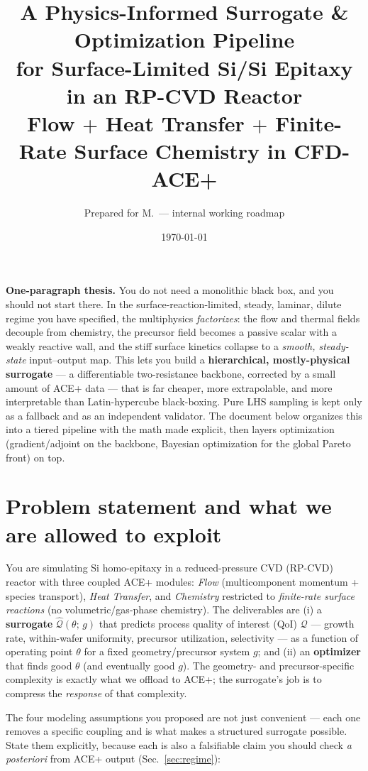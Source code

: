 \documentclass[11pt]{article}
\title{\vspace{-1.2cm}\textbf{A Physics-Informed Surrogate \& Optimization Pipeline\\ for Surface-Limited Si/Si Epitaxy in an RP-CVD Reactor}\\[2pt]
\large\normalfont\color{accent} Flow $+$ Heat Transfer $+$ Finite-Rate Surface Chemistry in CFD-ACE+}
\author{Prepared for M.\ — internal working roadmap}
\date{\today}
\begin{document}
\maketitle
\vspace{-0.6cm}

\begin{keybox}
\textbf{One-paragraph thesis.} You do not need a monolithic black box, and you should not start there. In the surface-reaction-limited, steady, laminar, dilute regime you have specified, the multiphysics \emph{factorizes}: the flow and thermal fields decouple from chemistry, the precursor field becomes a passive scalar with a weakly reactive wall, and the stiff surface kinetics collapse to a \emph{smooth, steady-state} input--output map. This lets you build a \textbf{hierarchical, mostly-physical surrogate} --- a differentiable two-resistance backbone, corrected by a small amount of ACE+ data --- that is far cheaper, more extrapolable, and more interpretable than Latin-hypercube black-boxing. Pure LHS sampling is kept only as a fallback and as an independent validator. The document below organizes this into a tiered pipeline with the math made explicit, then layers optimization (gradient/adjoint on the backbone, Bayesian optimization for the global Pareto front) on top.
\end{keybox}

\section{Problem statement and what we are allowed to exploit}

You are simulating Si homo-epitaxy in a reduced-pressure CVD (RP-CVD) reactor with three coupled ACE+ modules: \emph{Flow} (multicomponent momentum + species transport), \emph{Heat Transfer}, and \emph{Chemistry} restricted to \emph{finite-rate surface reactions} (no volumetric/gas-phase chemistry). The deliverables are (i) a \textbf{surrogate} $\widehat{\mathcal{Q}}(\theta;\,g)$ that predicts process quality of interest (QoI) $\mathcal{Q}$ --- growth rate, within-wafer uniformity, precursor utilization, selectivity --- as a function of operating point $\theta$ for a fixed geometry/precursor system $g$; and (ii) an \textbf{optimizer} that finds good $\theta$ (and eventually good $g$). The geometry- and precursor-specific complexity is exactly what we offload to ACE+; the surrogate's job is to compress the \emph{response} of that complexity.

The four modeling assumptions you proposed are not just convenient --- each one removes a specific coupling and is what makes a structured surrogate possible. State them explicitly, because each is also a falsifiable claim you should check \emph{a posteriori} from ACE+ output (Sec.~\ref{sec:regime}):
\end{document}
